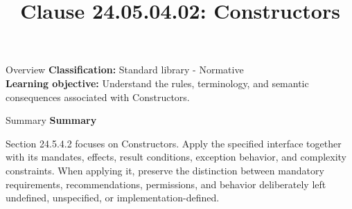 \documentclass[10pt,letterpaper]{article}
\title{Clause 24.05.04.02: Constructors}
\author{}
\date{}
\begin{document}
\maketitle
\begin{CornellOverviewBox}{Overview}
\textbf{Classification:} Standard library - Normative\\[2pt]
\textbf{Learning objective:} Understand the rules, terminology, and semantic consequences associated with Constructors.
\end{CornellOverviewBox}\begin{CornellSummaryBox}{Summary}
{\sffamily\bfseries\color{Accent} Summary}\par\vspace{3pt}Section 24.5.4.2 focuses on Constructors. Apply the specified interface together with its mandates, effects, result conditions, exception behavior, and complexity constraints. When applying it, preserve the distinction between mandatory requirements, recommendations, permissions, and behavior deliberately left undefined, unspecified, or implementation-defined.
\end{CornellSummaryBox}
\end{document}
